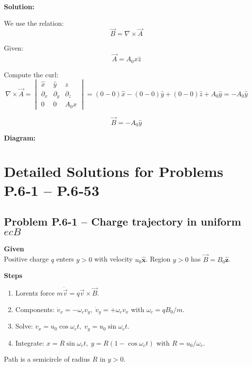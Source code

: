 \documentclass[12pt]{article}
\begin{document}
\textbf{Solution:}

We use the relation:
\[
\vec{B} = \nabla \times \vec{A}
\]

Given:
\[
\vec{A} = A_0 x \hat{z}
\]

Compute the curl:
\[
\nabla \times \vec{A} =
\begin{vmatrix}
\hat{x} & \hat{y} & \hat{z} \\
\partial_x & \partial_y & \partial_z \\
0 & 0 & A_0 x
\end{vmatrix}
= \left( 0 - 0 \right)\hat{x} - \left( 0 - 0 \right)\hat{y} + \left( 0 - 0 \right)\hat{z} + A_0 \hat{y}
= -A_0 \hat{y}
\]

\begin{tcolorbox}
\[
\boxed{\vec{B} = -A_0 \hat{y}}
\]
\end{tcolorbox}

\textbf{Diagram:}
\begin{center}
\end{center}




\section*{Detailed Solutions for Problems P.6‑1 – P.6‑53}

\bigskip
\subsection*{Problem P.6-1 – Charge trajectory in uniform \( ec B \)}\n
\textbf{Given}\\
Positive charge \(q\) enters \(y>0\) with velocity \(u_0\hat{\mathbf x}\). Region \(y>0\) has \(\vec B=B_0\hat{\mathbf z}\).

\textbf{Steps}
\begin{enumerate}
\item Lorentz force \(m\dot{\vec v}=q\vec v\times \vec B\).
\item Components: \(\dot v_x=-\omega_c v_y,\;\dot v_y=+ \omega_c v_x\) with \(\omega_c=qB_0/m\).
\item Solve: \(v_x=u_0\cos\omega_c t,\;v_y=u_0\sin\omega_c t\).
\item Integrate: \(x=R\sin\omega_c t,\;y=R(1-\cos\omega_c t)\) with \(R=u_0/\omega_c\).
\end{enumerate}
Path is a semicircle of radius \(R\) in \(y>0\).
\end{document}
